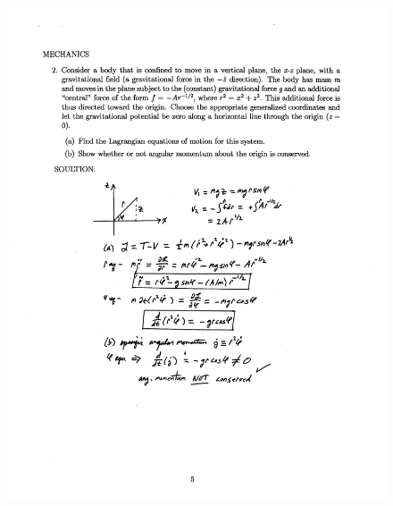 \documentclass[10pt,a4paper]{article}
\begin{document}
\begin{figure}[H]
 \centering
 \includegraphics[width=16cm]{pdf/1-1T32.png}
\end{figure}
 \newpage
\end{document}
